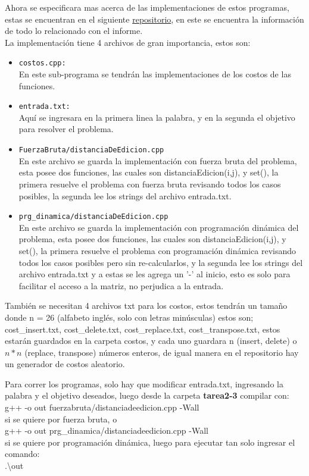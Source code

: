 Ahora se especificara mas acerca de las implementaciones de estos programas, estas se encuentran en el siguiente \href{https://github.com/Mappo1562/DistanciaMinimaDeEdicionExtendida}{repositorio}, en este se encuentra la información de todo lo relacionado con el informe.\\
La implementación tiene 4 archivos de gran importancia, estos son:
\begin{itemize}
    \item \texttt{costos.cpp:}\\ En este sub-programa se tendrán las implementaciones de los costos de las funciones.
    \item \texttt{entrada.txt:}\\ Aquí se ingresara en la primera linea la palabra, y en la segunda el objetivo para resolver el problema.
    \item \texttt{FuerzaBruta/distanciaDeEdicion.cpp}\\ En este archivo se guarda la implementación con fuerza bruta del problema, esta posee dos funciones, las cuales son distanciaEdicion(i,j), y set(), la primera resuelve el problema con fuerza bruta revisando todos los casos posibles, la segunda lee los strings del archivo entrada.txt.
    \item \texttt{prg\_dinamica/distanciaDeEdicion.cpp}\\ En este archivo se guarda la implementación con programación dinámica del problema, esta posee dos funciones, las cuales son distanciaEdicion(i,j), y set(), la primera resuelve el problema con programación dinámica revisando todos los casos posibles pero sin re-calcularlos, y la segunda lee los strings del archivo entrada.txt y a estas se les agrega un '-' al inicio, esto es solo para facilitar el acceso a la matriz, no perjudica a la entrada.
\end{itemize}

También se necesitan 4 archivos txt para los costos, estos tendrán un tamaño donde n = 26 (alfabeto inglés, solo con letras minúsculas) estos son; cost\_insert.txt, cost\_delete.txt, cost\_replace.txt, cost\_transpose.txt, estos estarán guardados en la carpeta costos, y cada uno guardara n (insert, delete) o $n*n$ (replace, transpose) números enteros, de igual manera en el repositorio hay un generador de costos aleatorio.

Para correr los programas, solo hay que modificar entrada.txt, ingresando la palabra y el objetivo deseados, luego desde la carpeta \textbf{tarea2-3} compilar con:\\
g++ -o out fuerzabruta/distanciadeedicion.cpp -Wall\\
si se quiere por fuerza bruta, o\\
g++ -o out prg\_dinamica/distanciadeedicion.cpp -Wall\\
si se quiere por programación dinámica, luego para ejecutar tan solo ingresar el comando:\\
.\textbackslash{}out
